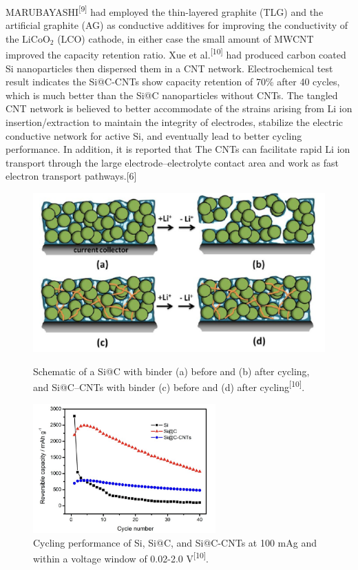 MARUBAYASHI\textsuperscript{[9]} had employed the thin-layered graphite (TLG) and the artificial graphite (AG) as conductive additives for improving the conductivity of the $\mathrm{LiCoO_{2}}$ (LCO) cathode, in either case the small amount of MWCNT improved the capacity retention ratio. Xue et al.\textsuperscript{[10]} had produced carbon coated Si nanoparticles then dispersed them in a CNT network. Electrochemical test result indicates the Si@C-CNTs show capacity retention of 70\% after 40 cycles, which is much better than the Si@C nanoparticles without CNTs. The tangled CNT network is believed to  better accommodate of the strains arising from Li ion insertion/extraction to maintain the integrity of electrodes, stabilize the electric conductive network for active Si, and eventually lead to better cycling performance. In addition, it is reported that The CNTs can facilitate rapid Li ion transport through the large electrode–electrolyte contact area and work as fast electron transport pathways.[6] 
\begin{figure}[H]
\begin{minipage}[t]{0.5\textwidth}
 \centering
 \includegraphics[scale=0.35]{src/fig/fig9.png}
 \caption{Schematic of a Si@C with binder (a) before and (b) after cycling, and Si@C--CNTs with binder (c) before and (d) after cycling\textsuperscript{[10]}.}
 \end{minipage}
\begin{minipage}[t]{0.5\textwidth}
\includegraphics[width=7cm]{src/fig/fig10.png}
\caption{Cycling performance of Si, Si@C, and Si@C-CNTs at 100 mA\/g and within a voltage window of 0.02-2.0 V\textsuperscript{[10]}.}
\end{minipage}
\end{figure}

